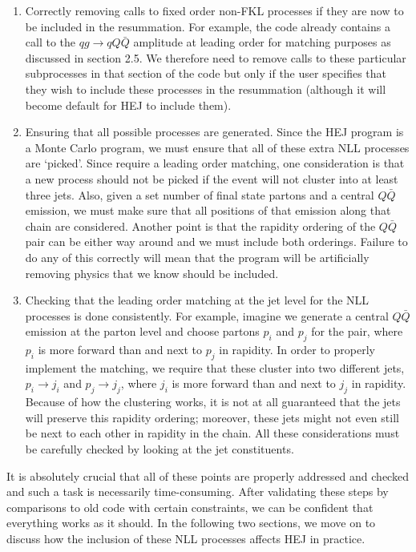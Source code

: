 \begin{enumerate}
\item{Correctly removing calls to fixed order non-FKL processes if they are now to be included in the resummation. For example, the code already contains a call to the $qg \to qQ\bar{Q}$ amplitude at leading order for matching purposes as discussed in section 2.5. We therefore need to remove calls to these particular subprocesses in that section of the code but only if the user specifies that they wish to include these processes in the resummation (although it will become default for HEJ to include them). }
\item{Ensuring that all possible processes are generated. Since the HEJ program is a Monte Carlo program, we must ensure that all of these extra NLL processes are `picked'. Since require a leading order matching, one consideration is that a new process should not be picked if the event will not cluster into at least three jets. Also, given a set number of final state partons and a central $Q\bar{Q}$ emission, we must make sure that all positions of that emission along that chain are considered. Another point is that the rapidity ordering of the $Q\bar{Q}$ pair can be either way around and we must include both orderings. Failure to do any of this correctly will mean that the program will be artificially removing physics that we know should be included.}
\item{Checking that the leading order matching at the jet level for the NLL processes is done consistently. For example, imagine we generate a central $Q\bar{Q}$ emission at the parton level and choose partons $p_i$ and $p_j$ for the pair, where $p_i$ is more forward than and next to $p_j$ in rapidity. In order to properly implement the matching, we require that these cluster into two different jets, $p_i \to j_i$ and $p_j \to j_j$, where $j_i$ is more forward than and next to $j_j$ in rapidity. Because of how the clustering works, it is not at all guaranteed that the jets will preserve this rapidity ordering; moreover, these jets might not even still be next to each other in rapidity in the chain. All these considerations must be carefully checked by looking at the jet constituents.}
\end{enumerate} 
It is absolutely crucial that all of these points are properly addressed and checked and such a task is necessarily time-consuming. After validating these steps by comparisons to old code with certain constraints, we can be confident that everything works as it should. In the following two sections, we move on to discuss how the inclusion of these NLL processes affects HEJ in practice. 

